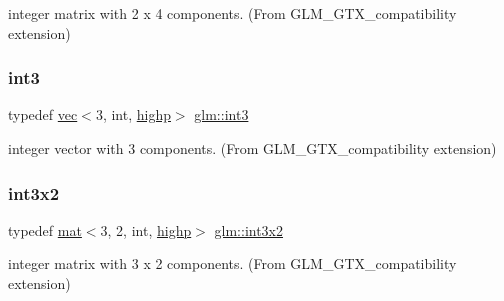 integer matrix with 2 x 4 components. (From G\+L\+M\+\_\+\+G\+T\+X\+\_\+compatibility extension) 

\mbox{\label{group__gtx__compatibility_ga90dda63e632aac169a8796ac06ff9de2}} 
\subsubsection{\texorpdfstring{int3}{int3}}
{\footnotesize\ttfamily typedef \mbox{\hyperlink{structglm_1_1vec}{vec}}$<$3, int, \mbox{\hyperlink{namespaceglm_a36ed105b07c7746804d7fdc7cc90ff25ac6f7eab42eacbb10d59a58e95e362074}{highp}}$>$ \mbox{\hyperlink{group__gtx__compatibility_ga90dda63e632aac169a8796ac06ff9de2}{glm\+::int3}}}



integer vector with 3 components. (From G\+L\+M\+\_\+\+G\+T\+X\+\_\+compatibility extension) 

\mbox{\label{group__gtx__compatibility_ga3e01f29f95467e49bdfd1b000420d13e}} 
\subsubsection{\texorpdfstring{int3x2}{int3x2}}
{\footnotesize\ttfamily typedef \mbox{\hyperlink{structglm_1_1mat}{mat}}$<$3, 2, int, \mbox{\hyperlink{namespaceglm_a36ed105b07c7746804d7fdc7cc90ff25ac6f7eab42eacbb10d59a58e95e362074}{highp}}$>$ \mbox{\hyperlink{group__gtx__compatibility_ga3e01f29f95467e49bdfd1b000420d13e}{glm\+::int3x2}}}



integer matrix with 3 x 2 components. (From G\+L\+M\+\_\+\+G\+T\+X\+\_\+compatibility extension) 

\mbox{\label{group__gtx__compatibility_gac7c574e682731013783283d875602224}} 
